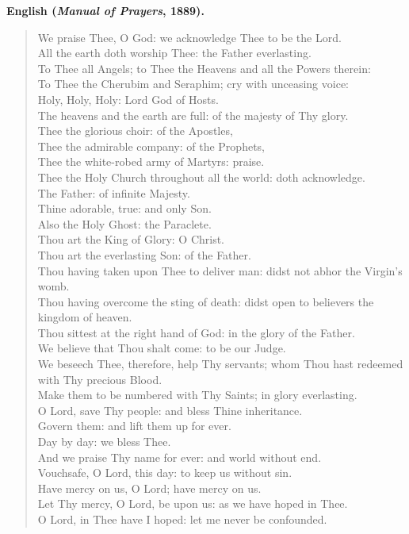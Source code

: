 \textbf{English (\textit{Manual of Prayers}, 1889).}

\begin{quote}
We praise Thee, O God: we acknowledge Thee to be the Lord.\\
All the earth doth worship Thee: the Father everlasting.\\
To Thee all Angels; to Thee the Heavens and all the Powers therein:\\
To Thee the Cherubim and Seraphim; cry with unceasing voice:\\
Holy, Holy, Holy: Lord God of Hosts.\\
The heavens and the earth are full: of the majesty of Thy glory.\\
Thee the glorious choir: of the Apostles,\\
Thee the admirable company: of the Prophets,\\
Thee the white-robed army of Martyrs: praise.\\
Thee the Holy Church throughout all the world: doth acknowledge.\\
The Father: of infinite Majesty.\\
Thine adorable, true: and only Son.\\
Also the Holy Ghost: the Paraclete.\\
Thou art the King of Glory: O Christ.\\
Thou art the everlasting Son: of the Father.\\
Thou having taken upon Thee to deliver man: didst not abhor the Virgin's womb.\\
Thou having overcome the sting of death: didst open to believers the kingdom of heaven.\\
Thou sittest at the right hand of God: in the glory of the Father.\\
We believe that Thou shalt come: to be our Judge.\\
We beseech Thee, therefore, help Thy servants; whom Thou hast redeemed with Thy precious Blood.\\
Make them to be numbered with Thy Saints; in glory everlasting.\\
O Lord, save Thy people: and bless Thine inheritance.\\
Govern them: and lift them up for ever.\\
Day by day: we bless Thee.\\
And we praise Thy name for ever: and world without end.\\
Vouchsafe, O Lord, this day: to keep us without sin.\\
Have mercy on us, O Lord; have mercy on us.\\
Let Thy mercy, O Lord, be upon us: as we have hoped in Thee.\\
O Lord, in Thee have I hoped: let me never be confounded.
\end{quote}

